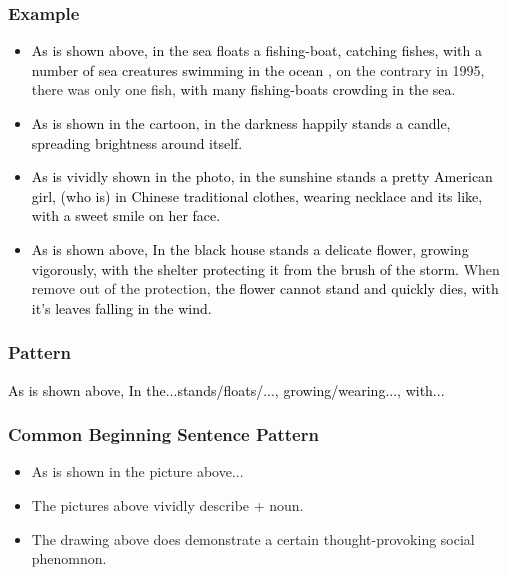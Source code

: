 \documentclass{article}
\begin{document}
\subsubsection{Example}
\label{sec:example-3}
\begin{itemize}
\item \textcolor{black}{As is shown above, } \textcolor{black}{in the sea floats a
    fishing-boat, } \textcolor{black}{catching fishes, } \textcolor{black}{with a number
    of sea creatures swimming in the ocean }, on the contrary in 1995, there was only one
  fish, \textcolor{black}{with many fishing-boats crowding in the sea}.
  
\item \textcolor{black}{As is shown in the cartoon, } \textcolor{black}{in the darkness
    happily stands a candle, } \textcolor{black}{spreading brightness around itself.}

\item \textcolor{black}{As is vividly shown in the photo, } \textcolor{black}{in the
    sunshine stands a pretty American girl, (who is) in Chinese traditional clothes, }
  \textcolor{black}{wearing necklace and its like,} \textcolor{black}{with a sweet smile
    on her face.}

\item \textcolor{black}{As is shown above, } \textcolor{black}{In the black house stands a
    delicate flower, }  \textcolor{black}{growing vigorously, } \textcolor{black}{with the
    shelter protecting it from the brush of the storm. } When remove out of the
  protection, \textcolor{black}{the flower cannot stand and quickly dies, }
  \textcolor{black}{with it's leaves falling in the wind.}

\end{itemize}

\subsubsection{Pattern}
\label{sec:pattern}
\par \textcolor{black}{As is shown above, } \textcolor{black}{In the...stands/floats/..., }
\textcolor{black}{growing/wearing..., } \textcolor{black}{with...}

\subsubsection{Common Beginning Sentence Pattern}
\label{sec:comm-beginn-sent-2}

\begin{itemize}
\item As is shown in the picture above...
\item The pictures above vividly describe + noun.
\item The drawing above does demonstrate a certain thought-provoking social phenomnon.
\end{itemize}
\end{document}
